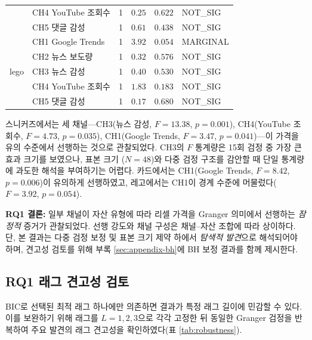 \documentclass[11pt, a4paper, twocolumn]{article}
\begin{document}
\begin{table}[!tbp]
\begin{tabular}{lllrrl}
 & CH4 YouTube 조회수 & 1 & $0.25$ & $0.622$ & NOT\_SIG \\
 & CH5 댓글 감성     & 1 & $0.61$ & $0.438$ & NOT\_SIG \\
\midrule
\multirow{5}{*}{lego}
 & CH1 Google Trends & 1 & $3.92$ & $0.054$ & MARGINAL \\
 & CH2 뉴스 보도량   & 1 & $0.32$ & $0.576$ & NOT\_SIG \\
 & CH3 뉴스 감성     & 1 & $0.40$ & $0.530$ & NOT\_SIG \\
 & CH4 YouTube 조회수 & 1 & $1.83$ & $0.183$ & NOT\_SIG \\
 & CH5 댓글 감성     & 1 & $0.17$ & $0.680$ & NOT\_SIG \\
\bottomrule
\end{tabular}
\end{table}

스니커즈에서는 세 채널---CH3(뉴스 감성, $F=13.38$, $p=0.001$),
CH4(YouTube 조회수, $F=4.73$, $p=0.035$), CH1(Google Trends, $F=3.47$,
$p=0.041$)---이 가격을 유의 수준에서 선행하는 것으로 관찰되었다. CH3의
$F$ 통계량은 15회 검정 중 가장 큰 효과 크기를 보였으나, 표본 크기
($N=48$)와 다중 검정 구조를 감안할 때 단일 통계량에 과도한 해석을
부여하기는 어렵다. 카드에서는 CH1(Google Trends, $F=8.42$, $p=0.006$)이
유의하게 선행하였고, 레고에서는 CH1이 경계 수준에 머물렀다($F=3.92$,
$p=0.054$).

\noindent\textbf{RQ1 결론:} 일부 채널이 자산 유형에 따라 리셀 가격을
Granger 의미에서 선행하는 \emph{잠정적} 증거가 관찰되었다. 선행 강도와
채널 구성은 채널--자산 조합에 따라 상이하다. 단, 본 결과는 다중 검정
보정 및 표본 크기 제약 하에서 \emph{탐색적 발견}으로 해석되어야 하며,
견고성 검토를 위해 부록 \ref{sec:appendix-bh}에 BH 보정 결과를 함께
제시한다.

\subsection{RQ1 래그 견고성 검토}\label{sec:results-robustness}

BIC로 선택된 최적 래그 하나에만 의존하면 결과가 특정 래그 길이에 민감할 수
있다. 이를 보완하기 위해 래그를 $L=1,2,3$으로 각각 고정한 뒤 동일한 Granger
검정을 반복하여 주요 발견의 래그 견고성을 확인하였다(표 \ref{tab:robustness}).
\end{document}
